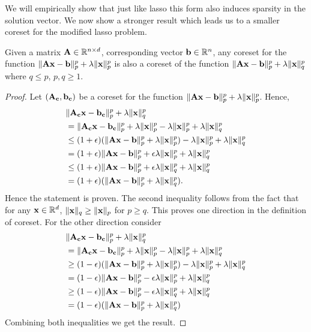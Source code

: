 We will empirically show that just like lasso this form also induces sparsity in the solution vector. We now show a stronger result which leads us to a smaller coreset for the modified lasso problem.
\begin{theorem}
Given a matrix $\mathbf{A} \in \mathbb{R}^{n \times d}$, corresponding vector $\mathbf{b} \in \mathbb{R}^n$, any coreset for the function $\|\mathbf{Ax-b}\|_p^p + \lambda\|\mathbf{x}\|_p^p$ is also a coreset of the function $\|\mathbf{Ax-b}\|_p^p + \lambda\|\mathbf{x}\|_q^p$ where $q\leq p$, $p,q \geq 1.$
\label{thm:pqcoreset}
\end{theorem}
\begin{proof}
    Let $(\mathbf{A_c}, \mathbf{b_c})$ be a coreset for the function $\|\mathbf{Ax-b}\|_p^p + \lambda\|\mathbf{x}\|_p^p$. Hence,
    \begin{align*}
    &\|\mathbf{A_cx-b_c}\|_p^p + \lambda\|\mathbf{x}\|_q^p\\
    &=\|\mathbf{A_cx-b_c}\|_p^p + \lambda\|\mathbf{x}\|_p^p - \lambda\|\mathbf{x}\|_p^p +  \lambda\|\mathbf{x}\|_q^p\\
    &\leq (1+ \epsilon)(\|\mathbf{Ax-b}\|_p^p + \lambda\|\mathbf{x}\|_p^p)-\lambda\|\mathbf{x}\|_p^p +  \lambda\|\mathbf{x}\|_q^p\\ 
    &=(1+\epsilon)\|\mathbf{Ax-b}\|_p^p + \epsilon\lambda\|\mathbf{x}\|_p^p+\lambda\|\mathbf{x}\|_q^p\\
    &\leq (1+\epsilon)\|\mathbf{Ax-b}\|_p^p + \epsilon\lambda\|\mathbf{x}\|_q^p+\lambda\|\mathbf{x}\|_q^p\\
    &= (1+ \epsilon)(\|\mathbf{Ax-b}\|_p^p + \lambda\|\mathbf{x}\|_q^p).
    \end{align*}
     Hence the statement is proven.
    The second inequality follows from the fact that for any $\mathbf{x} \in \mathbb{R}^d$, $\|\mathbf{x}\|_q \geq \|\mathbf{x}\|_p$ for $p\geq q$. This proves one direction in the definition of coreset. For the other direction consider
    \begin{align*}
     &\|\mathbf{A_cx-b_c}\|_p^p + \lambda\|\mathbf{x}\|_q^p\\
     &=\|\mathbf{A_cx-b_c}\|_p^p + \lambda\|\mathbf{x}\|_p^p - \lambda\|\mathbf{x}\|_p^p +  \lambda\|\mathbf{x}\|_q^p\\
     &\geq (1- \epsilon)(\|\mathbf{Ax-b}\|_p^p + \lambda\|\mathbf{x}\|_p^p) - \lambda\|\mathbf{x}\|_p^p +  \lambda\|\mathbf{x}\|_q^p\\
     &=(1-\epsilon) \|\mathbf{Ax-b}\|_p^p - \epsilon\lambda\|\mathbf{x}\|_p^p +\lambda\|\mathbf{x}\|_q^p\\
     &\geq (1-\epsilon) \|\mathbf{Ax-b}\|_p^p - \epsilon\lambda\|\mathbf{x}\|_q^p +\lambda\|\mathbf{x}\|_q^p\\
     &= (1-\epsilon)(\|\mathbf{Ax-b}\|_p^p + \lambda\|\mathbf{x}\|_q^p)
    \end{align*}
    Combining both inequalities we get the result.
\end{proof}


